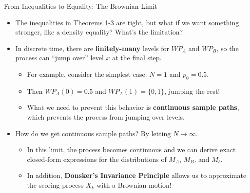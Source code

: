 \documentclass{beamer}
\begin{document}
\begin{frame}{From Inequalities to Equality: The Brownian Limit}
  \begin{itemize}
    \item The inequalities in Theorems 1-3 are tight, but what if we want something stronger, like a density equality? What's the limitation?
    \pause
    \item In discrete time, there are \textbf{finitely-many} levels for $WP_A$ and $WP_B$, so the process can ``jump over'' level $x$ at the final step.
    \pause
    \begin{itemize}
      \item For example, consider the simplest case: $N = 1$ and $p_0 = 0.5$.
      \pause
      \item Then $WP_A(0) = 0.5$ and $WP_A(1) = \{0, 1\}$, jumping the rest!
      \pause
      \item What we need to prevent this behavior is \textbf{continuous sample paths}, which prevents the process from jumping over levels.
    \end{itemize}
    \pause
    \item How do we get continuous sample paths? By letting $N \to \infty$.
    \pause
    \begin{itemize}
      \item In this limit, the process becomes continuous and we can derive exact closed-form expressions for the distributions of $M_A$, $M_B$, and $M_\ell$.
      \pause
      \item In addition, \textbf{Donsker's Invariance Principle} allows us to approximate the scoring process $X_k$ with a Brownian motion!
    \end{itemize}
  \end{itemize}
\end{frame}

\end{document}
